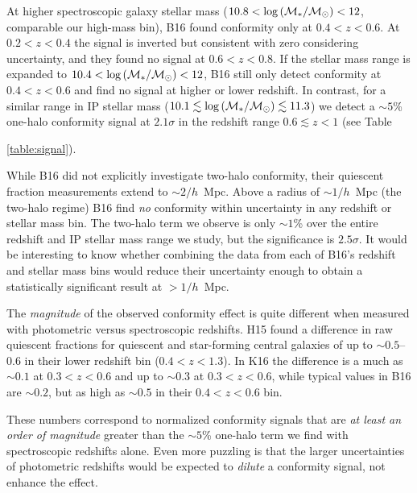 At higher spectroscopic galaxy stellar mass (${10.8 < \logM < 12}$, comparable our high-mass bin), B16 found conformity only at ${0.4<z<0.6}$.
At ${0.2<z<0.4}$ the signal is inverted but consistent with zero considering uncertainty, and they found no signal at ${0.6<z<0.8}$.
If the stellar mass range is expanded to ${10.4 < \logM < 12}$, B16 still only detect conformity at ${0.4<z<0.6}$ and find no signal at higher or lower redshift.
In contrast, for a similar range in IP stellar mass (${10.1\lesssim \logM \lesssim11.3}$) we detect a $\sim5$\% one-halo conformity signal at $2.1\sigma$ in the redshift range ${0.6\lesssim z<1}$ (see Table~{\ref{table:signal}).

While B16 did not explicitly investigate two-halo conformity, their quiescent fraction measurements extend to $\sim2/h$~Mpc.
Above a radius of $\sim1/h$~Mpc (the two-halo regime) B16 find \emph{no} conformity within uncertainty in any redshift or stellar mass bin.
The two-halo term we observe is only $\sim1$\% over the entire redshift and IP stellar mass range we study, but the significance is $2.5\sigma$.
It would be interesting to know whether combining the data from each of B16's redshift and stellar mass bins would reduce their uncertainty enough to obtain a statistically significant result at $>1/h$~Mpc.


The \emph{magnitude} of the observed conformity effect is quite different when measured with photometric versus spectroscopic redshifts.
H15 found a difference in raw quiescent fractions for quiescent and star-forming central galaxies of up to $\sim0.5$--0.6 in their lower redshift bin ($0.4<z<1.3$).
In K16 the difference is a much as $\sim0.1$ at ${0.3<z<0.6}$ and up to $\sim0.3$ at ${0.3<z<0.6}$, while typical values in B16 are $\sim0.2$, but as high as $\sim0.5$ in their ${0.4<z<0.6}$ bin.

These numbers correspond to normalized conformity signals that are \emph{at least an order of magnitude} greater than the $\sim5$\% one-halo term we find with spectroscopic redshifts alone.
Even more puzzling is that the larger uncertainties of photometric redshifts would be expected to \emph{dilute} a conformity signal, not enhance the effect. 

}
